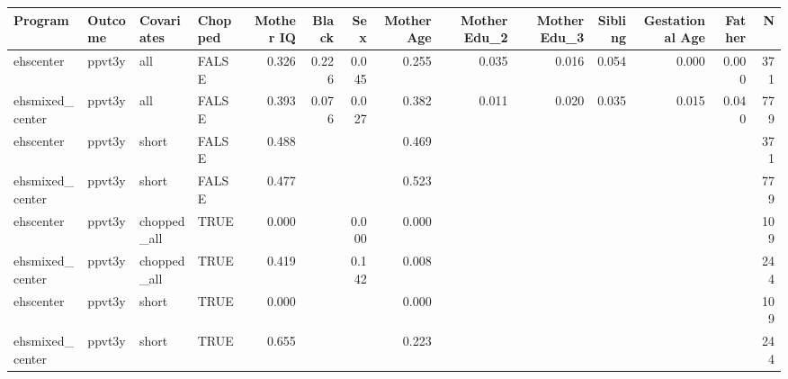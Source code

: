 \begin{table}[ht]
\centering
\begin{tabular}{llllrrrrrrrrrr}
  \hline
Program & Outcome & Covariates & Chopped & Mother IQ & Black & Sex & Mother Age & Mother Edu\_2 & Mother Edu\_3 & Sibling & Gestational Age & Father & N \\ 
  \hline
ehscenter & ppvt3y & all & FALSE & 0.326 & 0.226 & 0.045 & 0.255 & 0.035 & 0.016 & 0.054 & 0.000 & 0.000 & 371 \\ 
  ehsmixed\_center & ppvt3y & all & FALSE & 0.393 & 0.076 & 0.027 & 0.382 & 0.011 & 0.020 & 0.035 & 0.015 & 0.040 & 779 \\ 
  ehscenter & ppvt3y & short & FALSE & 0.488 &  &  & 0.469 &  &  &  &  &  & 371 \\ 
  ehsmixed\_center & ppvt3y & short & FALSE & 0.477 &  &  & 0.523 &  &  &  &  &  & 779 \\ 
  ehscenter & ppvt3y & chopped\_all & TRUE & 0.000 &  & 0.000 & 0.000 &  &  &  &  &  & 109 \\ 
  ehsmixed\_center & ppvt3y & chopped\_all & TRUE & 0.419 &  & 0.142 & 0.008 &  &  &  &  &  & 244 \\ 
  ehscenter & ppvt3y & short & TRUE & 0.000 &  &  & 0.000 &  &  &  &  &  & 109 \\ 
  ehsmixed\_center & ppvt3y & short & TRUE & 0.655 &  &  & 0.223 &  &  &  &  &  & 244 \\ 
   \hline
\end{tabular}
\end{table}
